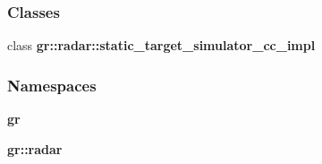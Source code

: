 \subsubsection*{Classes}
\begin{DoxyCompactItemize}
\item 
class {\bf gr\+::radar\+::static\+\_\+target\+\_\+simulator\+\_\+cc\+\_\+impl}
\end{DoxyCompactItemize}
\subsubsection*{Namespaces}
\begin{DoxyCompactItemize}
\item 
 {\bf gr}
\item 
 {\bf gr\+::radar}
\end{DoxyCompactItemize}
